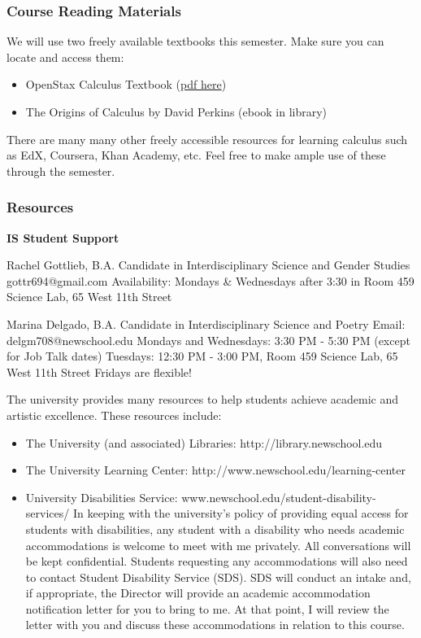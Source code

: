 \documentclass[11pt]{article}
\providecommand{\tightlist}{%
      \setlength{\itemsep}{0pt}\setlength{\parskip}{0pt}}
\begin{document}
\subsubsection{Course Reading Materials}\label{course-reading-materials}

We will use two freely available textbooks this semester. Make sure you
can locate and access them:

\begin{itemize}
\tightlist
\item
  OpenStax Calculus Textbook
  (\href{https://openstax.org/details/books/calculus-volume-1}{pdf
  here})
\item
  The Origins of Calculus by David Perkins (ebook in library)
\end{itemize}

There are many many other freely accessible resources for learning
calculus such as EdX, Coursera, Khan Academy, etc. Feel free to make
ample use of these through the semester.

\subsubsection{Resources}\label{resources}

\textbf{IS Student Support}

Rachel Gottlieb, B.A. Candidate in Interdisciplinary Science and Gender
Studies gottr694@gmail.com Availability: Mondays \& Wednesdays after
3:30 in Room 459 Science Lab, 65 West 11th Street

Marina Delgado, B.A. Candidate in Interdisciplinary Science and Poetry
Email: delgm708@newschool.edu Mondays and Wednesdays: 3:30 PM - 5:30 PM
(except for Job Talk dates) Tuesdays: 12:30 PM - 3:00 PM, Room 459
Science Lab, 65 West 11th Street Fridays are flexible!

The university provides many resources to help students achieve academic
and artistic excellence. These resources include:

\begin{itemize}
\tightlist
\item
  The University (and associated) Libraries:
  http://library.newschool.edu
\item
  The University Learning Center:
  http://www.newschool.edu/learning-center
\item
  University Disabilities Service:
  www.newschool.edu/student-disability-services/ In keeping with the
  university's policy of providing equal access for students with
  disabilities, any student with a disability who needs academic
  accommodations is welcome to meet with me privately. All conversations
  will be kept confidential. Students requesting any accommodations will
  also need to contact Student Disability Service (SDS). SDS will
  conduct an intake and, if appropriate, the Director will provide an
  academic accommodation notification letter for you to bring to me. At
  that point, I will review the letter with you and discuss these
  accommodations in relation to this course.
\end{itemize}
\end{document}
